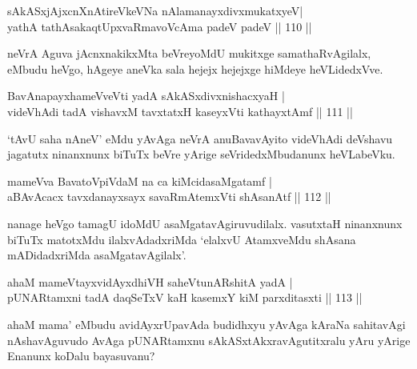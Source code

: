 \begin{shl}
sAkASxjAjxcnXnAtireVkeVNa nAlamanayxdivxmukatxyeV|\\
yathA tathA\s sakaqtUpxvaRmavoVcAma padeV padeV \hfill || 110 || 
\end{shl}

\begin{artha}
neVrA Aguva jAcnxnakikxMta beVreyoMdU mukitxge samathaRvAgilalx, eMbudu heVgo, hAgeye aneVka sala hejejx hejejxge hiMdeye heVLidedxVve.
\end{artha}


\begin{shl}
BavAnapayxhameVveVti yadA sAkASxdivxnishacxyaH |\\
videVhAdi tadA vishavxM tavxtatxH kaseyxVti kathayxtAmf \hfill || 111 || 
\end{shl}

\begin{artha}
`tAvU saha nAneV' eMdu yAvAga neVrA anuBavavAyito videVhAdi deVshavu jagatutx ninanxnunx biTuTx beVre yArige seVridedxMbudanunx heVLabeVku.
\end{artha}


\begin{shl}
mameVva BavatoV\s piVdaM na ca kiMcidasaMgatamf |\\
aBAvAcacx tavxdanayxsayx savaRmAtemxVti shAsanAtf  \hfill || 112 || 
\end{shl}

\begin{artha}
nanage heVgo tamagU idoMdU asaMgatavAgiruvudilalx. vasutxtaH ninanxnunx biTuTx matotxMdu ilalxvAdadxriMda `elalxvU AtamxveMdu shAsana mADidadxriMda asaMgatavAgilalx'.
\end{artha}

\begin{shl}
ahaM mameVtayxvidAyxdhiVH saheVtunARshitA yadA |\\
pUNARtamxni tadA daqSeTxV kaH kasemxY kiM parxditasxti \hfill || 113 || 
\end{shl}

\begin{artha}
ahaM mama' eMbudu avidAyxrUpavAda budidhxyu yAvAga kAraNa sahitavAgi nAshavAguvudo AvAga pUNARtamxnu sAkASxtAkxravAgutitxralu yAru yArige Enanunx koDalu bayasuvanu?
\end{artha}

